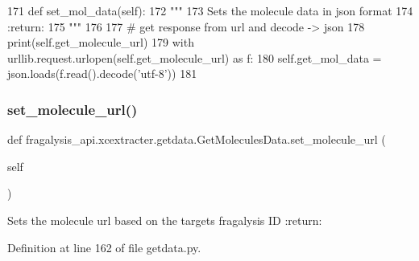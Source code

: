 \begin{DoxyCode}
171     \textcolor{keyword}{def }set\_mol\_data(self):
172         \textcolor{stringliteral}{"""}
173 \textcolor{stringliteral}{        Sets the molecule data in json format}
174 \textcolor{stringliteral}{        :return:}
175 \textcolor{stringliteral}{        """}
176 
177         \textcolor{comment}{# get response from url and decode -> json}
178         print(self.get\_molecule\_url)
179         with urllib.request.urlopen(self.get\_molecule\_url) \textcolor{keyword}{as} f:
180             self.get\_mol\_data = json.loads(f.read().decode(\textcolor{stringliteral}{'utf-8'}))
181 
\end{DoxyCode}
\mbox{\label{classfragalysis__api_1_1xcextracter_1_1getdata_1_1_get_molecules_data_a61f7510bc705fab0ee33128872619f40}} 
\subsubsection{\texorpdfstring{set\+\_\+molecule\+\_\+url()}{set\_molecule\_url()}}
{\footnotesize\ttfamily def fragalysis\+\_\+api.\+xcextracter.\+getdata.\+Get\+Molecules\+Data.\+set\+\_\+molecule\+\_\+url (\begin{DoxyParamCaption}\item[{}]{self }\end{DoxyParamCaption})}

\begin{DoxyVerb}Sets the molecule url based on the targets fragalysis ID
:return:
\end{DoxyVerb}
 

Definition at line 162 of file getdata.\+py.



